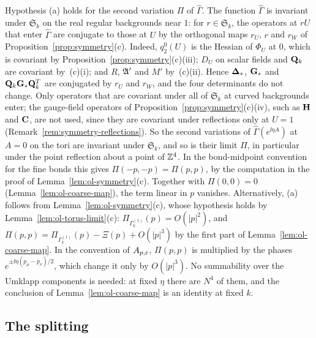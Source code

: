 Hypothesis (a) holds for the second variation $\Pi$ of $\widehat\Gamma$. The function $\widehat\Gamma$ is invariant under $\mathfrak S_k$ on the real regular backgrounds near $1$: for $r\in\mathfrak S_k$, the operators at $rU$ that enter $\widehat\Gamma$ are conjugate to those at $U$ by the orthogonal maps $r_U$, $r$ and $r_W$ of Proposition~\ref{prop:symmetry}(c). Indeed, $q_2^0(U)$ is the Hessian of $\Phi_U$ at $0$, which is covariant by Proposition~\ref{prop:symmetry}(c)(iii); $D_U$ on scalar fields and $\mathbf Q_k$ are covariant by~(c)(i); and $R$, $\mathfrak A'$ and $M'$ by~(c)(ii). Hence $\boldsymbol{\Delta}_*$, $\mathbf G_*$ and $\mathbf Q_k\mathbf G_*\mathbf Q_k^T$ are conjugated by $r_U$ and $r_W$, and the four determinants do not change. Only operators that are covariant under all of $\mathfrak S_k$ at curved backgrounds enter; the gauge-field operators of Proposition~\ref{prop:symmetry}(c)(iv), such as $\mathbf H$ and $\mathbf C$, are not used, since they are covariant under reflections only at $U=1$ (Remark~\ref{rem:symmetry-reflections}). So the second variations of $\widehat\Gamma(e^{\ii\eta A})$ at $A=0$ on the tori are invariant under $\mathfrak S_k$, and so is their limit $\Pi$, in particular under the point reflection about a point of $\mathbb Z^4$. In the bond-midpoint convention for the fine bonds this gives $\Pi(-p,-p)=\Pi(p,p)$, by the computation in the proof of Lemma~\ref{lem:ol-symmetry}(c). Together with $\Pi(0,0)=0$ (Lemma~\ref{lem:ol-coarse-map}), the term linear in $p$ vanishes. Alternatively, (a) follows from Lemma~\ref{lem:ol-symmetry}(c), whose hypothesis holds by Lemma~\ref{lem:ol-torus-limit}(c): $\Pi_{\Gamma^{(1)}_k}(p)=O(|p|^2)$, and $\Pi(p,p)=\Pi_{\Gamma^{(1)}_k}(p)-\Xi(p)+O(|p|^3)$ by the first part of Lemma~\ref{lem:ol-coarse-map}. In the convention of $A_{p,\varepsilon}$, $\Pi(p,p)$ is multiplied by the phases $e^{\pm\ii\eta(p_\mu-p_\nu)/2}$, which change it only by $O(|p|^3)$. No summability over the Umklapp components is needed: at fixed $\eta$ there are $N^4$ of them, and the conclusion of Lemma~\ref{lem:ol-coarse-map} is an identity at fixed $k$.

\subsection{The splitting}\label{subsec:ol-vp-split}

